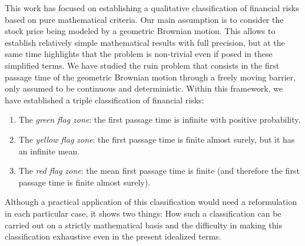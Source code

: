 \documentclass[12pt]{article}
\theoremstyle{definition}
\begin{document}
This work has focused on establishing a qualitative classification of financial risks based on pure mathematical criteria. Our main assumption is to consider the stock price being modeled by a geometric Brownian motion. This allows to establish relatively simple mathematical results with full precision, but at the same time highlights that the problem is non-trivial even if posed in these simplified terms. We have studied the ruin problem that consists in the first passage time of the geometric Brownian motion through a freely moving barrier, only assumed to be continuous and deterministic. Within this framework, we have established a triple classification of financial risks:
\begin{enumerate}
\item The {\it green flag zone}: the first passage time is infinite with positive probability.
\item The {\it yellow flag zone}: the first passage time is finite almost surely, but it has an infinite mean.
\item The {\it red flag zone}: the mean first passage time is finite (and therefore the first passage time is finite almost surely).
\end{enumerate}
Although a practical application of this classification would need a reformulation in each particular case, it shows two things: How such a classification can be carried out on a strictly mathematical basis and the difficulty in making this classification exhaustive even in the present idealized terms.

\end{document}

